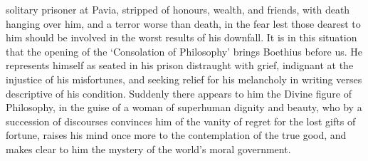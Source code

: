 \documentclass[11pt]{book}
\begin{document}
solitary prisoner at Pavia, stripped of honours, wealth, and friends,
with death hanging over him, and a terror worse than death, in the fear
lest those dearest to him should be involved in the worst results of his
downfall. It is in this situation that the opening of the `Consolation
of Philosophy' brings Boethius before us. He represents himself as
seated in his prison distraught with grief, indignant at the injustice
of his misfortunes, and seeking relief for his melancholy in writing
verses descriptive of his condition. Suddenly there appears to him the
Divine figure of Philosophy, in the guise of a woman of superhuman
dignity and beauty, who by a succession of discourses convinces him of
the vanity of regret for the lost gifts of fortune, raises his mind once
more to the contemplation of the true good, and makes clear to him the
mystery of the world's moral government.

\tableofcontents
\end{document}
